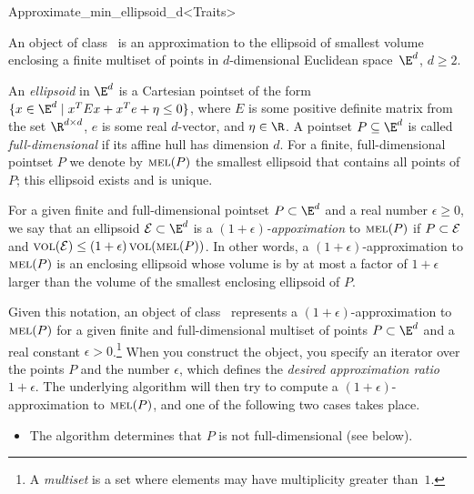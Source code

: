 \begin{ccRefClass}{Approximate_min_ellipsoid_d<Traits>}


\ccSaveThreeColumns

\ccDefinition

An object of class \ccRefName\ is an approximation to the
ellipsoid of smallest volume enclosing a finite multiset of points
in $d$-dimensional Euclidean space~$\E^d$, $d\ge 2$.

An \emph{ellipsoid} in $\E^d$ is a Cartesian pointset of the form $\{
x\in\E^d \mid x^T E x + x^T e + \eta\leq 0 \}$, where $E$ is some
positive definite matrix from the set $\R^{d\times d}$, $e$ is some
real $d$-vector, and $\eta\in\R$.  A pointset $P\subseteq \E^d$ is
called \emph{full-dimensional} if its affine hull has dimension $d$.
For a finite, full-dimensional pointset $P$ we denote by $\mathop{{\textsc{mel}}}\nolimits(P)$ the
smallest ellipsoid that contains all points of $P$; this ellipsoid
exists and is unique.


For a given finite and full-dimensional pointset $P\subset \E^d$ and a
real number $\epsilon\ge 0$, we say that an ellipsoid ${\cal
E}\subset\E^d$ is a \emph{$(1+\epsilon)$-appoximation} to $\mathop{{\textsc{mel}}}\nolimits(P)$ if
$P\subset {\cal E}$ and $\mathop{{\textsc{vol}}}\nolimits({\cal E}) \leq (1+\epsilon)
\mathop{{\textsc{vol}}}\nolimits(\mathop{{\textsc{mel}}}\nolimits(P))$.  In other words, a $(1+\epsilon)$-approximation to
$\mathop{{\textsc{mel}}}\nolimits(P)$ is an enclosing ellipsoid whose volume is by at most a
factor of $1+\epsilon$ larger than the volume of the smallest
enclosing ellipsoid of $P$.

Given this notation, an object of class \ccRefName\ represents a
$(1+\epsilon)$-approximation to $\mathop{{\textsc{mel}}}\nolimits(P)$ for a given finite and
full-dimensional multiset of points $P\subset\E^d$ and a real constant
$\epsilon>0$.\footnote{A \emph{multiset} is a set where elements may
have multiplicity greater than~$1$.} When you construct the object,
you specify an iterator over the points $P$ and the number $\epsilon$,
which defines the \emph{desired approximation ratio} $1+\epsilon$.
The underlying algorithm will then try to compute a
$(1+\epsilon)$-approximation to $\mathop{{\textsc{mel}}}\nolimits(P)$, and one of the following
two cases takes place.
\begin{itemize}
\item The algorithm determines that $P$ is not full-dimensional (see
   below).


\end{itemize}
\end{ccRefClass}
